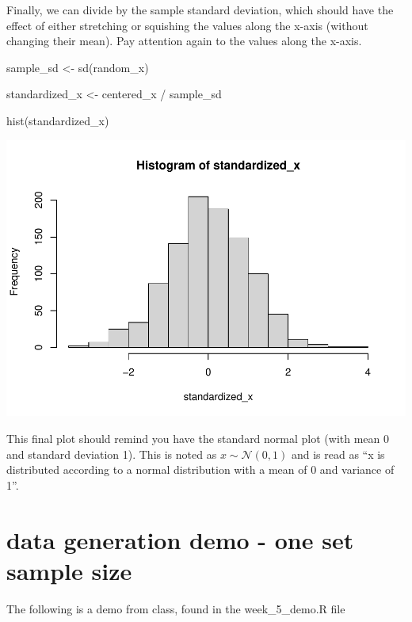 \documentclass[
]{book}
\newenvironment{Shaded}{\begin{snugshade}}{\end{snugshade}}
\newcommand{\FunctionTok}[1]{\textcolor[rgb]{0.00,0.00,0.00}{#1}}
\newcommand{\NormalTok}[1]{#1}
\newcommand{\OtherTok}[1]{\textcolor[rgb]{0.56,0.35,0.01}{#1}}
\newcommand{\SpecialCharTok}[1]{\textcolor[rgb]{0.00,0.00,0.00}{#1}}
\begin{document}
Finally, we can divide by the sample standard deviation, which should have the effect of either stretching or squishing the values along the x-axis (without changing their mean). Pay attention again to the values along the x-axis.

\begin{Shaded}
\begin{Highlighting}[]
\NormalTok{sample\_sd }\OtherTok{\textless{}{-}} \FunctionTok{sd}\NormalTok{(random\_x)}

\NormalTok{standardized\_x }\OtherTok{\textless{}{-}}\NormalTok{ centered\_x }\SpecialCharTok{/}\NormalTok{ sample\_sd}

\FunctionTok{hist}\NormalTok{(standardized\_x)}
\end{Highlighting}
\end{Shaded}

\includegraphics{test_course_notes_files/figure-latex/unnamed-chunk-76-1.pdf}

This final plot should remind you have the standard normal plot (with mean 0 and standard deviation 1). This is noted as \(x \sim \mathcal{N}(0, 1)\) and is read as ``x is distributed according to a normal distribution with a mean of 0 and variance of 1''.

\hypertarget{data-generation-demo---one-set-sample-size}{%
\section{data generation demo - one set sample size}\label{data-generation-demo---one-set-sample-size}}

The following is a demo from class, found in the week\_5\_demo.R file
\end{document}
